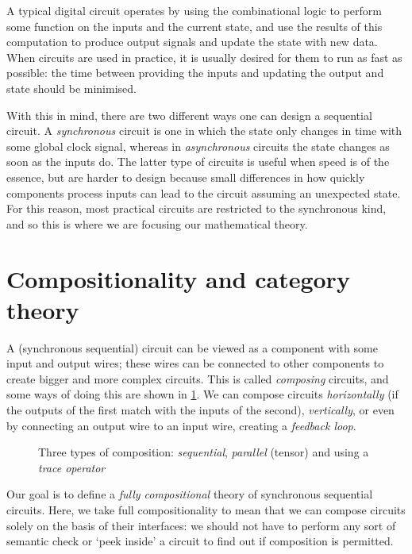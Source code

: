 A typical digital circuit operates by using the combinational logic to perform
some function on the inputs and the current state, and use the results of this
computation to produce output signals and update the state with new data.
When circuits are used in practice, it is usually desired for them to run as
fast as possible: the time between providing the inputs and updating the
output and state should be minimised.

With this in mind, there are two different ways one can design a sequential
circuit.
A \emph{synchronous} circuit is one in which the
state only changes in time with
some global clock signal, whereas in \emph{asynchronous}
 circuits the state changes as soon as the inputs
do.
The latter type of circuits is useful when speed is of the essence, but are
harder to design because small differences in how quickly components process
inputs can lead to the circuit assuming an unexpected state.
For this reason, most practical circuits are restricted to the synchronous
kind, and so this is where we are focusing our mathematical theory.

\section{Compositionality and category theory}

A (synchronous sequential) circuit can be viewed as a component with some
input and output wires; these wires can be connected to other components to
create bigger and more complex circuits.
This is called \emph{composing} circuits, and some ways of doing this are
shown in \cref{fig:composition}.
We can compose circuits \emph{horizontally} (if the outputs of the first match
with the inputs of the second), \emph{vertically}, or even by connecting an
output wire to an input wire, creating a \emph{feedback loop}.

\begin{figure}
    \centering
    \qquad
    \qquad
    \caption{
        Three types of composition: \emph{sequential}, \emph{parallel} (tensor)
        and using a \emph{trace operator}
    }
    \label{fig:composition}
\end{figure}

Our goal is to define a \emph{fully compositional} theory of synchronous
sequential circuits.
Here, we take full compositionality to mean that we can compose circuits solely
on the basis of their interfaces: we should not have to perform any sort of
semantic check or `peek inside' a circuit to find out if composition is
permitted.

